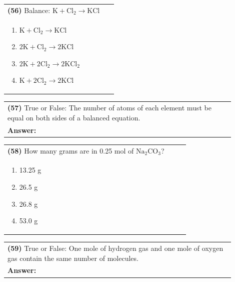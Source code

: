 \documentclass{article}
\begin{document}
\vspace{0.2cm}
\noindent \begin{tabular}{|p{0.9\linewidth}|}
\hline
\vspace{0.2cm}
\textbf{(56)} Balance: $\mathrm{K + Cl_2 \rightarrow KCl}$\\
\begin{minipage}[t]{0.85\linewidth}
\begin{enumerate}[label=\alph*.]
\item $\mathrm{K + Cl_2 \rightarrow KCl}$
\item $\mathrm{2K + Cl_2 \rightarrow 2KCl}$
\item $\mathrm{2K + 2Cl_2 \rightarrow 2KCl_2}$
\item $\mathrm{K + 2Cl_2 \rightarrow 2KCl}$
\end{enumerate}
\end{minipage}\\
\hline
\end{tabular}
\newpage

\vspace{0.2cm}
\noindent \begin{tabular}{|p{0.9\linewidth}|}
\hline
\vspace{0.2cm}
\textbf{(57)} True or False: The number of atoms of each element must be equal on both sides of a balanced equation.\\
\textbf{Answer:} \underline{\hspace{2cm}}\\
\hline
\end{tabular}

\vspace{0.2cm}
\noindent \begin{tabular}{|p{0.9\linewidth}|}
\hline
\vspace{0.2cm}
\textbf{(58)} How many grams are in 0.25 mol of $\mathrm{Na_2CO_3}$?\\
\begin{minipage}[t]{0.85\linewidth}
\begin{enumerate}[label=\alph*.]
\item 13.25 g
\item 26.5 g
\item 26.8 g
\item 53.0 g
\end{enumerate}
\end{minipage}\\
\hline
\end{tabular}

\vspace{0.2cm}
\noindent \begin{tabular}{|p{0.9\linewidth}|}
\hline
\vspace{0.2cm}
\textbf{(59)} True or False: One mole of hydrogen gas and one mole of oxygen gas contain the same number of molecules.\\
\textbf{Answer:} \underline{\hspace{2cm}}\\
\hline
\end{tabular}
\end{document}
